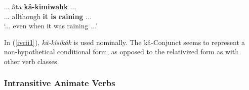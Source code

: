         \begin{exe}
        \ex
        \gll   ... âta \textbf{kâ-kimiwahk} ...\\
               ... allthough {\textbf{it is raining}} ...\\
        \trans `... even when it was raining ...' \citep[36]{Minde1997kwayask}
        \label{ivcii1}
        \end{exe}
    
   In (\ref{ivcii1}), \textit{kâ-kîsikâk} is used nominally. The kâ-Conjunct seems to represent a non-hypothetical conditional form, as opposed to the relativized form as with other verb classes.
                
 \FloatBarrier
    
    
    \subsubsection{Intransitive Animate Verbs}
